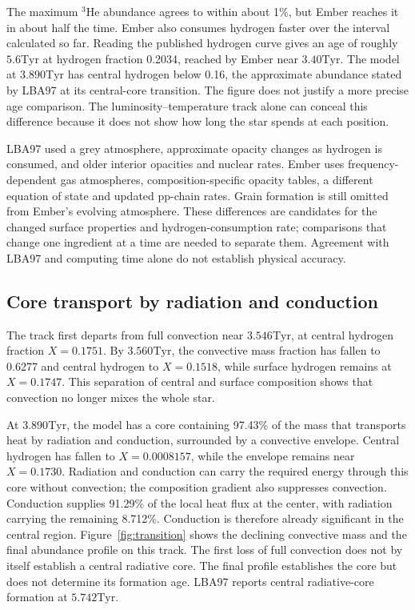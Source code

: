 \documentclass[11pt,letterpaper]{article}
\newcommand{\Tyr}{\mathrm{Tyr}}
\begin{document}
The maximum $^3$He abundance agrees to within about 1\%, but Ember reaches it
in about half the time. Ember also consumes hydrogen faster over the interval
calculated so far. Reading the published hydrogen curve gives an age of
roughly $5.6\Tyr$ at hydrogen fraction 0.2034, reached by Ember near
$3.40\Tyr$. The model at $3.890\Tyr$ has central hydrogen below 0.16,
the approximate abundance stated by LBA97 at its central-core transition. The figure does not justify a more precise age comparison.
The luminosity--temperature track alone can conceal this difference because
it does not show how long the star spends at each position.

LBA97 used a grey atmosphere, approximate opacity changes as hydrogen is
consumed, and older interior opacities and nuclear rates. Ember uses
frequency-dependent gas atmospheres, composition-specific opacity tables,
a different equation of state and updated pp-chain rates. Grain formation
is still omitted from Ember's evolving atmosphere. These differences are
candidates for the changed surface properties and hydrogen-consumption rate;
comparisons that change one ingredient at a time are needed to separate them.
Agreement with LBA97 and computing time alone do not establish physical
accuracy.

\subsection{Core transport by radiation and conduction}
The track first departs from full convection near $3.546\Tyr$, at central
hydrogen fraction $X=0.1751$. By $3.560\Tyr$, the convective mass fraction
has fallen to 0.6277 and central hydrogen to $X=0.1518$, while surface
hydrogen remains at $X=0.1747$. This separation of central and surface
composition shows that convection no longer mixes the whole star.

At $3.890\Tyr$, the model has a core containing 97.43\% of the mass that
transports heat by radiation and conduction, surrounded by a convective envelope.
Central hydrogen has fallen to $X=0.0008157$, while the envelope remains
near $X=0.1730$. Radiation and conduction can carry the required energy
through this core without convection; the composition gradient also suppresses
convection. Conduction supplies 91.29\% of the local heat flux at the center,
with radiation carrying the remaining 8.712\%. Conduction is therefore already
significant in the central region. Figure~\ref{fig:transition} shows
the declining convective mass and the final abundance profile on this track.
The first loss of full convection does not by itself establish a central
radiative core. The final profile establishes the core but does not determine its formation
age. LBA97 reports central
radiative-core formation at $5.742\Tyr$.
\end{document}
